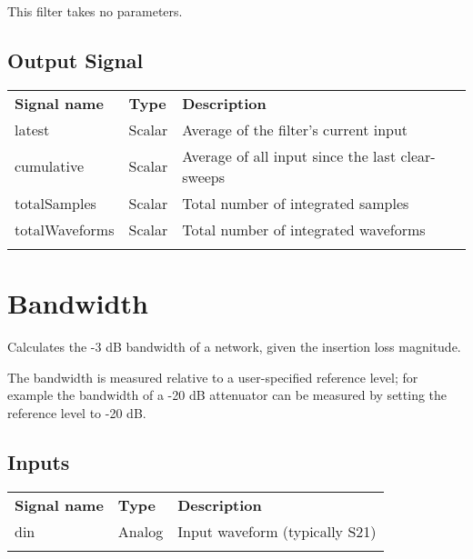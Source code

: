 This filter takes no parameters.

\subsection{Output Signal}

\begin{tabularx}{16cm}{llX}
\thickhline
\textbf{Signal name} & \textbf{Type} & \textbf{Description} \\
\thickhline
latest & Scalar & Average of the filter's current input \\
\thinhline
cumulative & Scalar & Average of all input since the last clear-sweeps\\
\thinhline
totalSamples & Scalar & Total number of integrated samples \\
\thinhline
totalWaveforms & Scalar & Total number of integrated waveforms \\
\thickhline
\end{tabularx}

\pagebreak
\section{Bandwidth}

Calculates the -3 dB bandwidth of a network, given the insertion loss magnitude.

The bandwidth is measured relative to a user-specified reference level; for example the bandwidth of a -20 dB
attenuator can be measured by setting the reference level to -20 dB.


\subsection{Inputs}

\begin{tabularx}{16cm}{llX}
\thickhline
\textbf{Signal name} & \textbf{Type} & \textbf{Description} \\
\thickhline
din & Analog & Input waveform (typically S21) \\
\thickhline
\end{tabularx}

